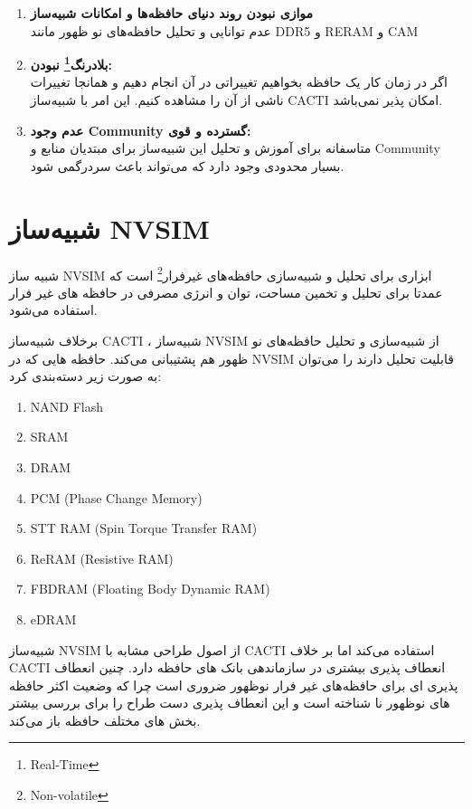 \documentclass[12pt]{exam}
\begin{document}
\begin{questions}
\begin{enumerate}
	\item \textbf{موازی نبودن روند دنیای حافظه‌ها و امکانات شبیه‌ساز}\\
عدم توانایی و تحلیل حافظه‌های نو ظهور مانند DDR5 و RERAM و CAM


	\item \textbf{بلادرنگ\footnote{Real-Time} نبودن: }\\
	اگر در زمان کار یک حافظه بخواهیم تغییراتی در آن انجام دهیم و همانجا تغییرات ناشی از آن را مشاهده کنیم. این امر با شبیه‌ساز CACTI امکان پذیر نمی‌باشد.
	
	\item \textbf{عدم وجود Community گسترده و قوی: }\\
	متاسفانه برای آموزش و تحلیل این شبیه‌ساز برای مبتدیان منابع و Community بسیار محدودی وجود دارد که می‌تواند باعث سردرگمی شود.
\end{enumerate}












\section{شبیه‌ساز NVSIM}
شبیه ساز NVSIM ابزاری برای تحلیل و شبیه‌سازی حافظه‌های غیرفرار\footnote{Non-volatile} است که عمدتا برای تحلیل و تخمین مساحت، توان و انرژی مصرفی در حافظه های غیر فرار استفاده می‌شود.

برخلاف شبیه‌ساز CACTI ، شبیه‌ساز NVSIM از شبیه‌سازی و تحلیل حافظه‌های نو ظهور هم پشتیبانی می‌کند. حافظه هایی که در NVSIM قابلیت تحلیل دارند را می‌توان به صورت زیر دسته‌بندی کرد:

\begin{latin}
	\begin{enumerate}
		\item NAND Flash
		\item SRAM
		\item DRAM
		\item PCM (Phase Change Memory)
		\item STT RAM (Spin Torque Transfer RAM)	
		\item ReRAM (Resistive RAM)
		\item FBDRAM (Floating Body Dynamic RAM)
		\item eDRAM	
	\end{enumerate} 
\end{latin}

شبیه‌ساز NVSIM از اصول طراحی مشابه با CACTI استفاده می‌کند اما بر خلاف CACTI انعطاف پذیری بیشتری در سازماندهی بانک های حافظه دارد. چنین انعطاف پذیری ای برای حافظه‌های غیر فرار نوظهور ضروری است چرا که وضعیت اکثر حافظه های نوظهور نا شناخته است و این انعطاف پذیری دست طراح را برای بررسی بیشتر بخش های مختلف حافظه باز می‌کند.


\end{questions}
\end{document}
